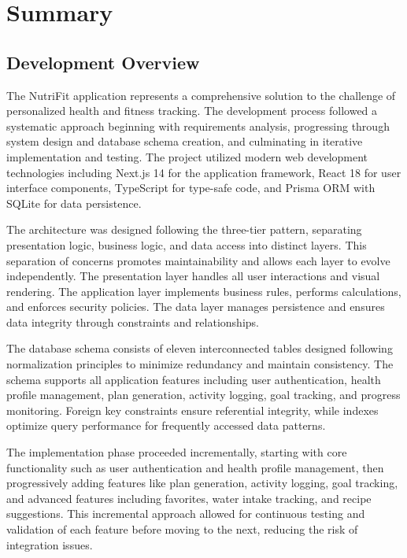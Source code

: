 \chapter{Summary}

\section{Development Overview}

The NutriFit application represents a comprehensive solution to the challenge of personalized health and fitness tracking. The development process followed a systematic approach beginning with requirements analysis, progressing through system design and database schema creation, and culminating in iterative implementation and testing. The project utilized modern web development technologies including Next.js 14 for the application framework, React 18 for user interface components, TypeScript for type-safe code, and Prisma ORM with SQLite for data persistence.

The architecture was designed following the three-tier pattern, separating presentation logic, business logic, and data access into distinct layers. This separation of concerns promotes maintainability and allows each layer to evolve independently. The presentation layer handles all user interactions and visual rendering. The application layer implements business rules, performs calculations, and enforces security policies. The data layer manages persistence and ensures data integrity through constraints and relationships.

The database schema consists of eleven interconnected tables designed following normalization principles to minimize redundancy and maintain consistency. The schema supports all application features including user authentication, health profile management, plan generation, activity logging, goal tracking, and progress monitoring. Foreign key constraints ensure referential integrity, while indexes optimize query performance for frequently accessed data patterns.

The implementation phase proceeded incrementally, starting with core functionality such as user authentication and health profile management, then progressively adding features like plan generation, activity logging, goal tracking, and advanced features including favorites, water intake tracking, and recipe suggestions. This incremental approach allowed for continuous testing and validation of each feature before moving to the next, reducing the risk of integration issues.

